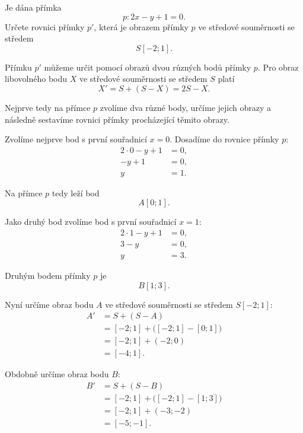 \begin{example}\label{exa:Central_symmetry_line}
    Je dána přímka
    \[
        p:2x-y+1=0.
    \]
    Určete rovnici přímky $p'$, která je obrazem přímky $p$ ve
    středové souměrnosti se středem
    \[
        S[-2;1].
    \]

    Přímku $p'$ můžeme určit pomocí obrazů dvou různých bodů přímky
    $p$. Pro obraz libovolného bodu $X$ ve středové souměrnosti se
    středem $S$ platí
    \[
        X'=S+(S-X)=2S-X.
    \]

    Nejprve tedy na přímce $p$ zvolíme dva různé body, určíme jejich
    obrazy a následně sestavíme rovnici přímky procházející těmito
    obrazy.

    Zvolíme nejprve bod s první souřadnicí $x=0$. Dosadíme do rovnice
    přímky $p$:
    \begin{align*}
        2\cdot0-y+1&=0,\\
        -y+1&=0,\\
        y&=1.
    \end{align*}

    Na přímce $p$ tedy leží bod
    \[
        A[0;1].
    \]

    Jako druhý bod zvolíme bod s první souřadnicí $x=1$:
    \begin{align*}
        2\cdot1-y+1&=0,\\
        3-y&=0,\\
        y&=3.
    \end{align*}

    Druhým bodem přímky $p$ je
    \[
        B[1;3].
    \]

    Nyní určíme obraz bodu $A$ ve středové souměrnosti se středem
    $S[-2;1]$:
    \begin{align*}
        A'
        &=
        S+(S-A)\\
        &=
        [-2;1]+\bigl([-2;1]-[0;1]\bigr)\\
        &=
        [-2;1]+(-2;0)\\
        &=
        [-4;1].
    \end{align*}

    Obdobně určíme obraz bodu $B$:
    \begin{align*}
        B'
        &=
        S+(S-B)\\
        &=
        [-2;1]+\bigl([-2;1]-[1;3]\bigr)\\
        &=
        [-2;1]+(-3;-2)\\
        &=
        [-5;-1].
    \end{align*}


\end{example}
